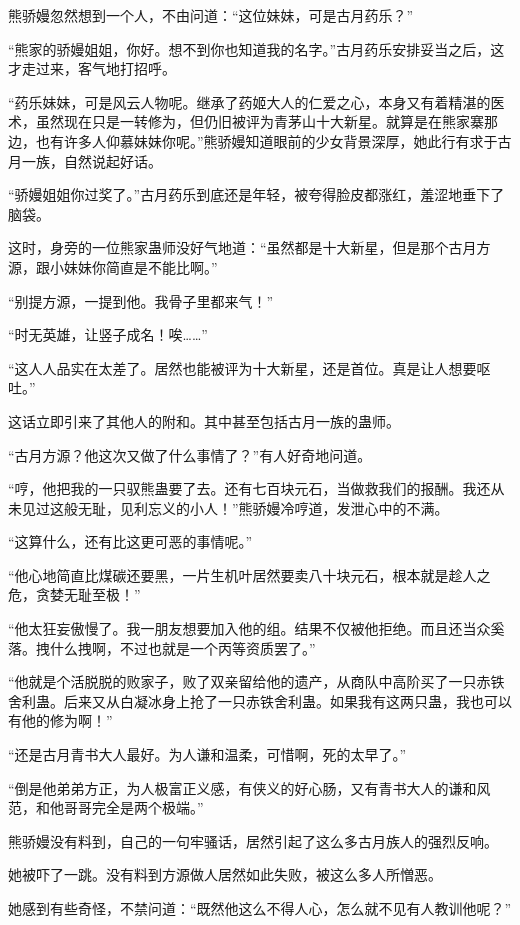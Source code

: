 \begin{this_body}
熊骄嫚忽然想到一个人，不由问道：“这位妹妹，可是古月药乐？”

“熊家的骄嫚姐姐，你好。想不到你也知道我的名字。”古月药乐安排妥当之后，这才走过来，客气地打招呼。

“药乐妹妹，可是风云人物呢。继承了药姬大人的仁爱之心，本身又有着精湛的医术，虽然现在只是一转修为，但仍旧被评为青茅山十大新星。就算是在熊家寨那边，也有许多人仰慕妹妹你呢。”熊骄嫚知道眼前的少女背景深厚，她此行有求于古月一族，自然说起好话。

“骄嫚姐姐你过奖了。”古月药乐到底还是年轻，被夸得脸皮都涨红，羞涩地垂下了脑袋。

这时，身旁的一位熊家蛊师没好气地道：“虽然都是十大新星，但是那个古月方源，跟小妹妹你简直是不能比啊。”

“别提方源，一提到他。我骨子里都来气！”

“时无英雄，让竖子成名！唉……”

“这人人品实在太差了。居然也能被评为十大新星，还是首位。真是让人想要呕吐。”

这话立即引来了其他人的附和。其中甚至包括古月一族的蛊师。

“古月方源？他这次又做了什么事情了？”有人好奇地问道。

“哼，他把我的一只驭熊蛊要了去。还有七百块元石，当做救我们的报酬。我还从未见过这般无耻，见利忘义的小人！”熊骄嫚冷哼道，发泄心中的不满。

“这算什么，还有比这更可恶的事情呢。”

“他心地简直比煤碳还要黑，一片生机叶居然要卖八十块元石，根本就是趁人之危，贪婪无耻至极！”

“他太狂妄傲慢了。我一朋友想要加入他的组。结果不仅被他拒绝。而且还当众奚落。拽什么拽啊，不过也就是一个丙等资质罢了。”

“他就是个活脱脱的败家子，败了双亲留给他的遗产，从商队中高阶买了一只赤铁舍利蛊。后来又从白凝冰身上抢了一只赤铁舍利蛊。如果我有这两只蛊，我也可以有他的修为啊！”

“还是古月青书大人最好。为人谦和温柔，可惜啊，死的太早了。”

“倒是他弟弟方正，为人极富正义感，有侠义的好心肠，又有青书大人的谦和风范，和他哥哥完全是两个极端。”

熊骄嫚没有料到，自己的一句牢骚话，居然引起了这么多古月族人的强烈反响。

她被吓了一跳。没有料到方源做人居然如此失败，被这么多人所憎恶。

她感到有些奇怪，不禁问道：“既然他这么不得人心，怎么就不见有人教训他呢？”


\end{this_body}
